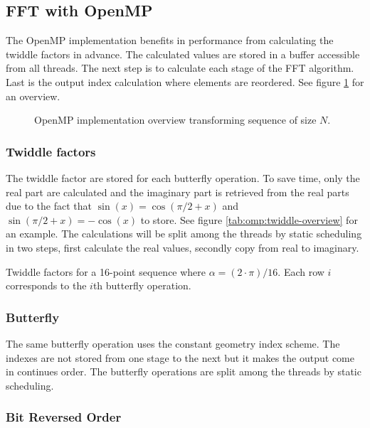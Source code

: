 \subsection{FFT with OpenMP}

The OpenMP implementation benefits in performance from calculating the twiddle factors in advance. The calculated values are stored in a buffer accessible from all threads. The next step is to calculate each stage of the FFT algorithm. Last is the output index calculation where elements are reordered. See figure \ref{fig:omp:overview} for an overview.

\begin{figure}
	\centering
	
	\caption{OpenMP implementation overview transforming sequence of size $N$.}
	\label{fig:omp:overview}
\end{figure}

\subsubsection{Twiddle factors}

The twiddle factor are stored for each butterfly operation. To save time, only the real part are calculated and the imaginary part is retrieved from the real parts due to the fact that $\sin(x) = \cos(\pi/2 + x)$ and $\sin(\pi/2 + x) = -\cos(x)$ to store. See figure \ref{tab:omp:twiddle-overview} for an example. The calculations will be split among the threads by static scheduling in two steps, first calculate the real values, secondly copy from real to imaginary.

\begin{table}[h!]
	\centering
	
	\caption{Twiddle factors for a 16-point sequence where $\alpha = (2 \cdot \pi) / 16$. Each row $i$ corresponds to the $i$th butterfly operation.}
	\label{tab:omp:twiddle-overview}
\end{table}

\subsubsection{Butterfly}

The same butterfly operation uses the constant geometry index scheme. The indexes are not stored from one stage to the next but it makes the output come in continues order. The butterfly operations are split among the threads by static scheduling.

\subsubsection{Bit Reversed Order}

